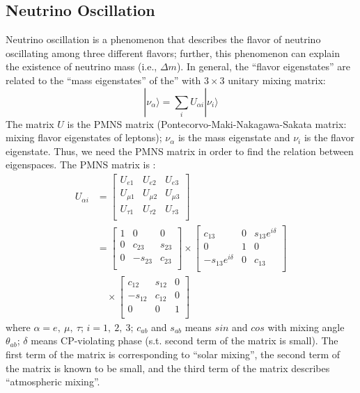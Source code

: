 \documentclass[12pt]{article}
\begin{document}
\begin{multicols}{2}
    \subsection{Neutrino Oscillation}
        Neutrino oscillation is a phenomenon that describes the flavor of neutrino oscillating among three different flavors; further, this phenomenon can explain the existence of neutrino mass (i.e., $\Delta m$). In general, the ``flavor eigenstates'' are related to the ``mass eigenstates'' of the'' with $3 \times 3$ unitary mixing matrix:
        \[
            | \nu_{\alpha} \rangle = \sum_{i} U_{\alpha i} | \nu_{i} \rangle
        \]
        The matrix $U$ is the PMNS matrix (Pontecorvo-Maki-Nakagawa-Sakata matrix: mixing flavor eigenstates of leptons); $\nu_\alpha$ is the mass eigenstate and $\nu_i$ is the flavor eigenstate. Thus, we need the PMNS matrix in order to find the relation between eigenspaces. The PMNS matrix is \cite{SKexp} \cite{AtoNeu}:
        \begin{align*}
            U_{\alpha i} &= 
            \begin{bmatrix}
                U_{e1}     & U_{e2}     & U_{e3}    \\
                U_{\mu 1}  & U_{\mu 2}  & U_{\mu 3} \\
                U_{\tau 1} & U_{\tau 2} & U_{\tau 3}\\
            \end{bmatrix}\\
            &=
            \begin{bmatrix}
                1 & 0       & 0     \\
                0 & c_{23}  & s_{23}\\
                0 & -s_{23} & c_{23}\\
            \end{bmatrix}
            \times
            \begin{bmatrix}
                c_{13}             & 0 & s_{13}e^{i\delta}\\
                0                  & 1 & 0                \\
                -s_{13}e^{i\delta} & 0 & c_{13}           \\
            \end{bmatrix}\\
            &\quad \mathbin \times
            \begin{bmatrix}
                c_{12}  & s_{12} & 0\\
                -s_{12} & c_{12} & 0\\
                0       & 0      & 1\\
            \end{bmatrix}
        \end{align*}
        where $\alpha = e,\ \mu,\ \tau$; $i = 1,\ 2,\ 3$; $c_{ab}$ and $s_{ab}$ means $sin$ and $cos$ with mixing angle $\theta_{ab}$; $\delta$ means CP-violating phase (s.t. second term of the matrix is small). The first term of the matrix is corresponding to ``solar mixing'', the second term of the matrix is known to be small, and the third term of the matrix describes ``atmospheric mixing''.


\end{multicols}
\end{document}
